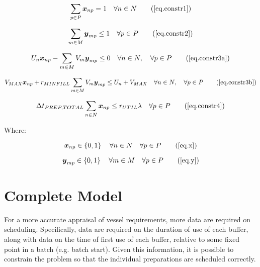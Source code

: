 \begin{equation}
    \sum_{p \in P} \boldsymbol{x}_{np} = 1 \quad \forall n \in N
    \tag{\ref{eq.constr1}}
\end{equation}

\begin{equation}
    \sum_{m \in M} \boldsymbol{y}_{mp} \le 1 \quad \forall p \in P
    \tag{\ref{eq.constr2}}
\end{equation}

\begin{equation}
    U_{n} \boldsymbol{x}_{np} - \sum_{m \in M} V_{m} \boldsymbol{y}_{mp} \le 0
    \quad \forall n \in N, \quad \forall p \in P
    \tag{\ref{eq.constr3a}}
\end{equation}

\begin{equation}
    V_{MAX} \boldsymbol{x}_{np} + r_{MINFILL} \sum_{m \in M} V_{m} 
    \boldsymbol{y}_{mp} \le U_{n} + V_{MAX} \quad \forall n \in N, \quad
    \forall p \in P
    \tag{\ref{eq.constr3b}}
\end{equation}

\begin{equation}
    \Delta t_{PREP,TOTAL} \sum_{n \in N} \boldsymbol{x}_{np} \le r_{UTIL} 
    \lambda \quad \forall p \in P
    \tag{\ref{eq.constr4}}
\end{equation}

Where:

\begin{equation}
    \boldsymbol{x}_{np} \in \left\{ 0, 1 \right\} \quad \forall n \in N \quad
    \forall p \in P
    \tag{\ref{eq.x}}
\end{equation}

\begin{equation}
    \boldsymbol{y}_{mp} \in \left\{ 0, 1 \right\} \quad \forall m \in M \quad
    \forall p \in P
    \tag{\ref{eq.y}}
\end{equation}


\section{Complete Model}\label{S.prepsched}

For a more accurate appraisal of vessel requirements, more data are required
on scheduling.
Specifically, data are required on the duration of use of each buffer, along
with data on the time of first use of each buffer, relative to some fixed point
in a batch (e.g. batch start).
Given this information, it is possible to constrain the problem so that the
individual preparations are scheduled correctly.

